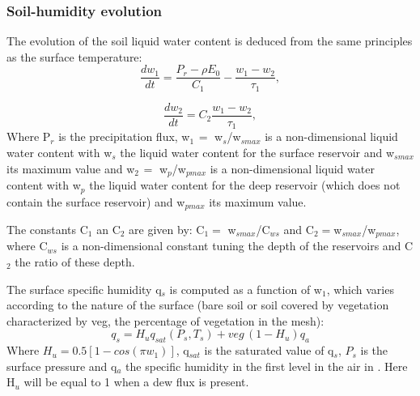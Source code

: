 \subsubsection{Soil-humidity evolution}
The evolution of the soil liquid water content is deduced from the same
principles as the surface temperature:
\begin{equation}
\label{eq23}
\frac{dw_{1}}{dt}=\frac{P_{r}-\rho E_{0}}{C_{1}}-\frac{w_{1}-w_{2}}{\tau
_{1}},
\end{equation}

\begin{equation}
\label{eq24}
\frac{dw_{2}}{dt}=C_{2}\frac{w_{1}-w_{2}}{\tau_{1}},
\end{equation}
Where P$_{r}$ is the precipitation flux,
\newline
w$_{1\, }=$ w$_{s}$/w$_{smax}$ is a non-dimensional liquid water content with w$_{s}$ the liquid water content
for the surface reservoir and w$_{smax}$ its maximum value and
\newline
w$_{2\, }=$ w$_{p}$/w$_{pmax}$ is a non-dimensional liquid water content with w$_{p}$ the liquid water content
for the deep reservoir (which does not contain the surface reservoir) and w$_{pmax}$ its maximum value.

The constants C$_{1}$ an C$_{2}$ are given by:
\newline
C$_{1}=$ w$_{smax}$/C$_{ws}$ and C$_{2}=$w$_{smax}$/w$_{pmax}$,
\newline
where C$_{ws}$ is a non-dimensional constant tuning
the depth of the reservoirs and C$_{2}$ the ratio of these depth.

The surface specific humidity q$_{s}$ is computed as a function of w$_{1}$,
which varies according to the nature of the surface (bare soil or soil
covered by vegetation characterized by veg, the percentage of vegetation in
the mesh):
\begin{equation}
\label{eq25}
q_{s}=H_{u}q_{sat}\left( P_{s},T_{s} \right)+veg\, \left( 1-H_{u}
\right)q_{a}
\end{equation}
\newline
Where $H_{u}=0.5\left[ 1-cos\left( \pi w_{1} \right) \right]$,
\newline
q$_{sat}$ is the saturated value of q$_{s}$, $P_{s}$ is the surface pressure
\newline
and q$_{a}$ the specific humidity in the first level in the air in \CS.
\newline
Here H$_{u}$ will be equal to 1 when a dew flux is present.

